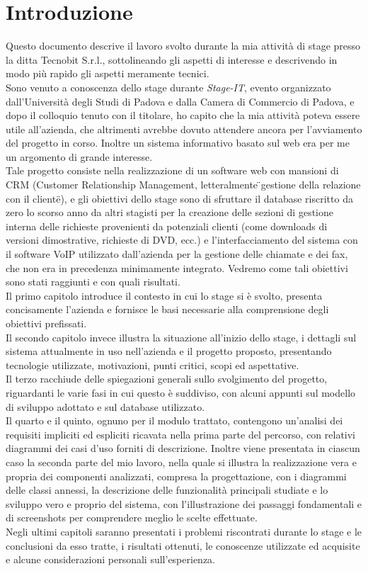\section{Introduzione}
Questo documento descrive il lavoro svolto durante la mia attivit\` a di stage presso la ditta Tecnobit S.r.l., sottolineando gli aspetti di interesse e descrivendo in modo pi\`u rapido gli aspetti meramente tecnici. \\
Sono venuto a conoscenza dello stage durante \textit{Stage-IT}, evento organizzato dall'Universit\` a degli Studi di Padova e dalla Camera di Commercio di Padova, e dopo il colloquio tenuto con il titolare, ho capito che la mia attivit\`a poteva essere utile all'azienda, che altrimenti avrebbe dovuto attendere ancora per l'avviamento del progetto in corso. 
Inoltre un sistema informativo basato sul web era per me un argomento di grande interesse. \\
Tale progetto consiste nella realizzazione di un software web con mansioni di CRM (Customer Relationship Management, letteralmente \"{}gestione della relazione con il cliente\"{}), e gli obiettivi dello stage sono di sfruttare il database riscritto da zero lo scorso anno da altri stagisti per la creazione delle sezioni di gestione interna delle richieste provenienti da potenziali clienti (come downloads di versioni dimostrative, richieste di DVD, ecc.) e l'interfacciamento del sistema con il software VoIP utilizzato dall'azienda per la gestione delle chiamate e dei fax, che non era in precedenza minimamente integrato. Vedremo come tali obiettivi sono stati raggiunti e con quali risultati. \\
Il primo capitolo introduce il contesto in cui lo stage si \` e svolto, presenta concisamente l'azienda e fornisce le basi necessarie alla comprensione degli obiettivi prefissati. \\
Il secondo capitolo invece illustra la situazione all'inizio dello stage, i dettagli sul sistema attualmente in uso nell'azienda e il progetto proposto, presentando tecnologie utilizzate, motivazioni, punti critici, scopi ed aspettative.  \\
Il terzo racchiude delle spiegazioni generali sullo svolgimento del progetto, riguardanti le varie fasi in cui questo \`e suddiviso, con alcuni appunti sul modello di sviluppo adottato e sul database utilizzato.\\
Il quarto e il quinto, ognuno per il modulo trattato, contengono un'analisi dei requisiti impliciti ed espliciti ricavata nella prima parte del percorso, con relativi diagrammi dei casi d'uso forniti di descrizione. Inoltre viene presentata in ciascun caso la seconda parte del mio lavoro, nella quale si illustra la realizzazione vera e propria dei componenti analizzati, compresa la progettazione, con i diagrammi delle classi annessi, la descrizione delle funzionalit\`a principali studiate e lo sviluppo vero e proprio del sistema, con l'illustrazione dei passaggi fondamentali e di screenshots per comprendere meglio le scelte effettuate. \\
Negli ultimi capitoli saranno presentati i problemi riscontrati durante lo stage e le conclusioni da esso tratte, i risultati ottenuti, le conoscenze utilizzate ed acquisite e alcune considerazioni personali sull'esperienza.

